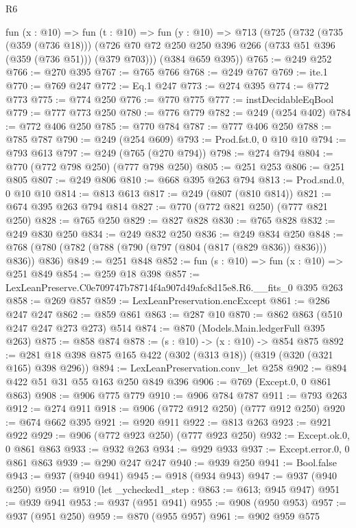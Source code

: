 \begin{lexlean}{R6}
\begin{coremodule}
  fun (x : @10) =>
  fun (t : @10) =>
  fun (y : @10) =>
  @713
    (@725
      (@732
        (@735 (@359 (@736 @18)))
        (@726 @70 @72 @250 @250 @396 @266 (@733 @51 @396 (@359 (@736 @51))) (@379 @703)))
      (@384 @659 @395))
@765 := @249 @252
@766 := @270 @395
@767 := @765 @766
@768 := @249 @767
@769 := ite.{1}
@770 := @769 @247
@772 := Eq.{1} @247
@773 := @274 @395
@774 := @772 @773
@775 := @774 @250
@776 := @770 @775
@777 := instDecidableEqBool
@779 := @777 @773 @250
@780 := @776 @779
@782 := @249 (@254 @402)
@784 := @772 @406 @250
@785 := @770 @784
@787 := @777 @406 @250
@788 := @785 @787
@790 := @249 (@254 @609)
@793 := Prod.fst.{0, 0} @10 @10
@794 := @793 @613
@797 := @249 (@765 (@270 @794))
@798 := @274 @794
@804 := @770 (@772 @798 @250) (@777 @798 @250)
@805 := @251 @253
@806 := @251 @805
@807 := @249 @806
@810 := @668 @395 @263 @794
@813 := Prod.snd.{0, 0} @10 @10
@814 := @813 @613
@817 := @249 (@807 (@810 @814))
@821 := @674 @395 @263 @794 @814
@827 := @770 (@772 @821 @250) (@777 @821 @250)
@828 := @765 @250
@829 := @827 @828
@830 := @765 @828
@832 := @249 @830 @250
@834 := @249 @832 @250
@836 := @249 @834 @250
@848 := @768 (@780 (@782 (@788 (@790 (@797 (@804 (@817 (@829 @836)) @836))) @836)) @836)
@849 := @251 @848
@852 := fun (s : @10) => fun (x : @10) => @251 @849
@854 := @259 @18 @398
@857 := LexLeanPreserve.C0e709747b78714f4a907d49afc8d15e8.R6.__fits_0 @395 @263
@858 := @269 @857
@859 := LexLeanPreservation.encExcept
@861 := @286 @247 @247
@862 := @859 @861
@863 := @287 @10
@870 := @862 @863 (@510 @247 @247 @273 @273) @514
@874 := @870 (Models.Main.ledgerFull @395 @263)
@875 := @858 @874
@878 := (s : @10) -> (x : @10) -> @854 @875
@892 := @281 @18 @398 @875 @165 @422 (@302 (@313 @18)) (@319 (@320 (@321 @165) @398 @296))
@894 := LexLeanPreservation.conv_let @258
@902 := @894 @422 @51 @31 @55 @163 @250 @849 @396
@906 := @769 (Except.{0, 0} @861 @863)
@908 := @906 @775 @779
@910 := @906 @784 @787
@911 := @793 @263
@912 := @274 @911
@918 := @906 (@772 @912 @250) (@777 @912 @250)
@920 := @674 @662 @395
@921 := @920 @911
@922 := @813 @263
@923 := @921 @922
@929 := @906 (@772 @923 @250) (@777 @923 @250)
@932 := Except.ok.{0, 0} @861 @863
@933 := @932 @263
@934 := @929 @933
@937 := Except.error.{0, 0} @861 @863
@939 := @290 @247 @247
@940 := @939 @250
@941 := Bool.false
@943 := @937 (@940 @941)
@945 := @918 (@934 @943)
@947 := @937 (@940 @250)
@950 := @910 (let _ychecked1_step : @863 := @613; @945 @947)
@951 := @939 @941
@953 := @937 (@951 @941)
@955 := @908 (@950 @953)
@957 := @937 (@951 @250)
@959 := @870 (@955 @957)
@961 := @902 @959 @575

\end{coremodule}
\end{lexlean}
